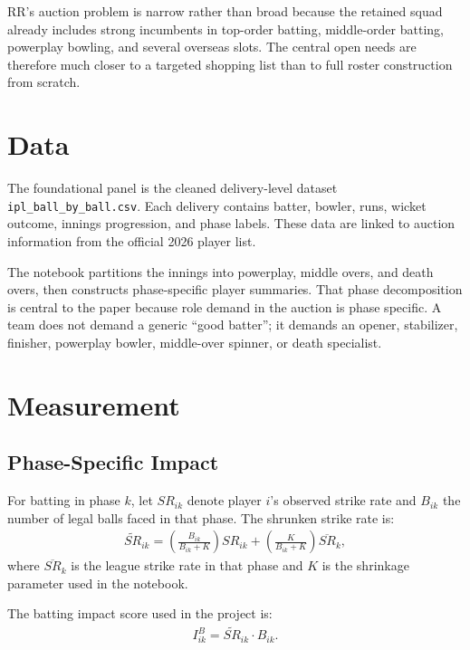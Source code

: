 \documentclass[11pt]{article}
\begin{document}
RR's auction problem is narrow rather than broad because the retained squad already includes strong incumbents in top-order batting, middle-order batting, powerplay bowling, and several overseas slots. The central open needs are therefore much closer to a targeted shopping list than to full roster construction from scratch.

\section{Data}

The foundational panel is the cleaned delivery-level dataset \texttt{ipl\_ball\_by\_ball.csv}. Each delivery contains batter, bowler, runs, wicket outcome, innings progression, and phase labels. These data are linked to auction information from the official 2026 player list.



The notebook partitions the innings into powerplay, middle overs, and death overs, then constructs phase-specific player summaries. That phase decomposition is central to the paper because role demand in the auction is phase specific. A team does not demand a generic ``good batter''; it demands an opener, stabilizer, finisher, powerplay bowler, middle-over spinner, or death specialist.

\section{Measurement}

\subsection{Phase-Specific Impact}

For batting in phase \(k\), let \(SR_{ik}\) denote player \(i\)'s observed strike rate and \(B_{ik}\) the number of legal balls faced in that phase. The shrunken strike rate is:
\begin{align}
\widetilde{SR}_{ik}
=
\left(\frac{B_{ik}}{B_{ik}+K}\right)SR_{ik}
+
\left(\frac{K}{B_{ik}+K}\right)\overline{SR}_{k},
\end{align}
where \(\overline{SR}_{k}\) is the league strike rate in that phase and \(K\) is the shrinkage parameter used in the notebook.

The batting impact score used in the project is:
\begin{align}
I_{ik}^{B}=\widetilde{SR}_{ik}\cdot B_{ik}.
\end{align}
\end{document}
